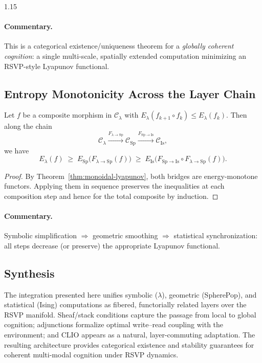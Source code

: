 \documentclass[12pt,a4paper]{article}
\begin{document}
\begin{spacing}{1.15}
\paragraph{Commentary.}
This is a categorical existence/uniqueness theorem for a \emph{globally coherent cognition}: a single multi-scale, spatially extended computation minimizing an RSVP-style Lyapunov functional.

\subsection{Entropy Monotonicity Across the Layer Chain}

\begin{theorem}
\label{thm:entropy-monotone}
Let $f$ be a composite morphism in $\mathcal{C}_{\lambda}$ with $E_{\lambda}(f_{k+1}\circ f_{k})\le E_{\lambda}(f_k)$. Then along the chain
\[
\mathcal{C}_{\lambda}\xrightarrow{F_{\lambda\to\mathrm{Sp}}}\mathcal{C}_{\mathrm{Sp}}
\xrightarrow{F_{\mathrm{Sp}\to\mathrm{Is}}}\mathcal{C}_{\mathrm{Is}},
\]
we have
\[
E_{\lambda}(f) \;\ge\;
E_{\mathrm{Sp}}\!\big(F_{\lambda\to\mathrm{Sp}}(f)\big)
\;\ge\;
E_{\mathrm{Is}}\!\big(F_{\mathrm{Sp}\to\mathrm{Is}}\circ F_{\lambda\to\mathrm{Sp}}(f)\big).
\]
\end{theorem}

\begin{proof}
By Theorem~\ref{thm:monoidal-lyapunov}, both bridges are energy-monotone functors. Applying them in sequence preserves the inequalities at each composition step and hence for the total composite by induction.
\end{proof}

\paragraph{Commentary.}
Symbolic simplification $\Rightarrow$ geometric smoothing $\Rightarrow$ statistical synchronization: all steps decrease (or preserve) the appropriate Lyapunov functional.

\subsection{Synthesis}
The integration presented here unifies symbolic ($\lambda$), geometric (SpherePop), and statistical (Ising) computations as fibered, functorially related layers over the RSVP manifold. Sheaf/stack conditions capture the passage from local to global cognition; adjunctions formalize optimal write–read coupling with the environment; and CLIO appears as a natural, layer-commuting adaptation. The resulting architecture provides categorical existence and stability guarantees for coherent multi-modal cognition under RSVP dynamics.


\end{spacing}
\end{document}
